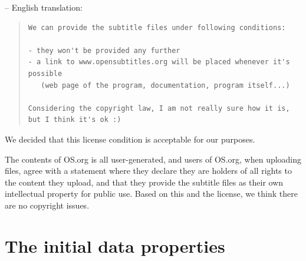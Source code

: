 \noindent -- English translation:

\begin{quote}
\begin{verbatim}
We can provide the subtitle files under following conditions:

- they won't be provided any further
- a link to www.opensubtitles.org will be placed whenever it's possible 
   (web page of the program, documentation, program itself...)

Considering the copyright law, I am not really sure how it is, 
but I think it's ok :)
\end{verbatim}
\end{quote}


\noindent We decided that this license condition is acceptable for our purposes. 

The contents of OS.org is all user-generated, and users of OS.org, when uploading files, agree with a statement where they declare they are holders of all rights to the content they upload, and that they provide the subtitle files as their own intellectual property for public use. Based on this and the license, we think there are no copyright issues.%


\section{The initial data properties}

